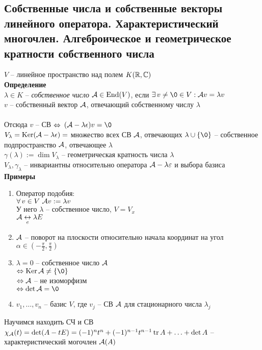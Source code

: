 \documentclass[12pt]{article}
\begin{document}
\subsection{Собственные числа и собственные векторы линейного оператора. Характеристический многочлен. Алгеброическое и геометрическое кратности собственного числа}
$V$ -- линейное пространство над полем $K(\mathbb{R}, \mathbb{C})$\\
\textbf{Определение}\\
$\lambda \in K$ -- \textit{собственное число} $\mathcal{A} \in \operatorname{End}(V)$, если $\ex v \neq \0 \in V: \mcA v = \lambda v$\\
$v$ -- собственный вектор $\mathcal{A}$, отвечающий собственному числу $\lambda$\\\\
Отсюда  $v$ -- СВ $\Leftrightarrow$ $(\mcA - \lambda \epsilon)v = \0$\\
$V_\lambda = \operatorname{Ker} (\mathcal{A} - \lambda\epsilon) = $ множество всех СВ $\mathcal{A}$, отвечающих $\lambda \cup \{\0\}$ -- собственное подпространство $\mathcal{A}$, отвечающее $\lambda$\\
$\gamma(\lambda) := \dim V_\lambda$ -- геометрическая кратность числа $\lambda$\\
$V_\lambda, \gamma_\lambda$ -- инвариантны относительно оператора $\mathcal{A} - \lambda \varepsilon$ и выбора базиса\\
\textbf{Примеры}
\begin{enumerate}
    \item Оператор подобия:\\
    $\forall\, v\in V\ \mathcal{A} v:= \lambda v$\\
    У него $\lambda$ -- собственное число, $V = V_x$\\
    $\mathcal{A} \underset{e}{\leftrightarrow} \lambda E$
    \item $\mathcal{A}$ -- поворот на плоскости относительно начала координат на угол $\alpha \in (-\frac\pi2, \frac\pi2)$
    \item $\lambda = 0$ -- собственное число $\mathcal{A}$\\
    $\LRto \ker \mcA \neq \{\0\}$\\
    $\Leftrightarrow \mathcal{A}$ -- не изоморфизм\\
    $\LRto \det \mcA = \0$
    \item $v_1,\ldots,v_n$ -- базис $V$, где $v_j$ -- СВ $\mathcal{A}$ для стационарного числа $\lambda_j$\\
\end{enumerate}
Научимся находить СЧ и СВ\\
$\chi_\mathcal{A}(t) = \det (A-tE) = (-1)^nt^n+(-1)^{n-1}t^{n-1}\operatorname{tr} A + \ldots + \det A$ -- характеристический могочлен $\mathcal{A}(A)$
\end{document}
